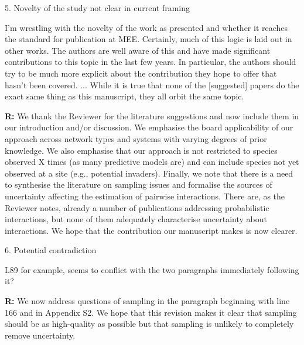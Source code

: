 \documentclass[12pt]{letter}
\newenvironment{refquote}{\bigskip \begin{it}}{\end{it}\smallskip}
\begin{document}
	5. Novelty of the study not clear in current framing


		\begin{refquote}
		I'm wrestling with the novelty of the work as presented and whether it reaches the standard for publication at MEE. Certainly, much of this logic is laid out in other works. The authors are well aware of this and have made significant contributions to this topic in the last few years. In particular, the authors should try to be much more explicit about the contribution they hope to offer that hasn't been covered. ...
		While it is true that none of the [suggested] papers do the exact same thing as this manuscript, they all	orbit the same topic. 
		\end{refquote}


		\textbf{R:} We thank the Reviewer for the literature suggestions and now include them in our introduction and/or discussion. We emphasise the board applicability of our approach across network types and systems with varying degrees of prior knowledge. We also emphasise that our approach is not restricted to species observed X times (as many predictive models are) and can include species not yet observed at a site (e.g., potential invaders). Finally, we note that there is a need to synthesise the literature on sampling issues and formalise the sources of uncertainty affecting the estimation of pairwise interactions. There are, as the Reviewer notes, already a number of publications addressing probabilistic interactions, but none of them adequately characterise uncertainty about interactions. We hope that the contribution our manuscript makes is now clearer.


	6. Potential contradiction 
 

		\begin{refquote}
		L89 for example, seems to conflict with the two paragraphs immediately following it?
		\end{refquote}


		\textbf{R:} We now address questions of sampling in the paragraph beginning with line 166 and in Appendix S2. We hope that this revision makes it clear that sampling should be as high-quality as possible but that sampling is unlikely to completely remove uncertainty.
\end{document}

